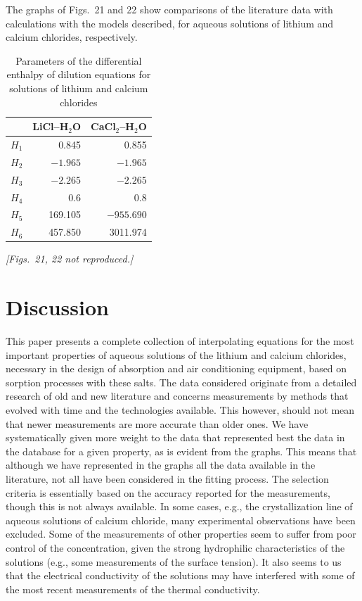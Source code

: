 \documentclass[11pt]{article}
\begin{document}
The graphs of Figs.~21 and 22 show comparisons of the literature data with calculations
with the models described, for aqueous solutions of lithium and calcium chlorides,
respectively.

\begin{table}[htbp]
\centering
\caption{Parameters of the differential enthalpy of dilution equations for solutions of
lithium and calcium chlorides}
\begin{tabular}{lrr}
\toprule
 & LiCl--H$_2$O & CaCl$_2$--H$_2$O \\
\midrule
$H_1$ & 0.845 & 0.855 \\
$H_2$ & $-1.965$ & $-1.965$ \\
$H_3$ & $-2.265$ & $-2.265$ \\
$H_4$ & 0.6 & 0.8 \\
$H_5$ & 169.105 & $-955.690$ \\
$H_6$ & 457.850 & 3011.974 \\
\bottomrule
\end{tabular}
\end{table}

\textit{[Figs.~21, 22 not reproduced.]}

\section{Discussion}

This paper presents a complete collection of interpolating equations for the most
important properties of aqueous solutions of the lithium and calcium chlorides, necessary
in the design of absorption and air conditioning equipment, based on sorption processes
with these salts. The data considered originate from a detailed research of old and new
literature and concerns measurements by methods that evolved with time and the
technologies available. This however, should not mean that newer measurements are more
accurate than older ones. We have systematically given more weight to the data that
represented best the data in the database for a given property, as is evident from the
graphs. This means that although we have represented in the graphs all the data available
in the literature, not all have been considered in the fitting process. The selection
criteria is essentially based on the accuracy reported for the measurements, though this
is not always available. In some cases, e.g., the crystallization line of aqueous
solutions of calcium chloride, many experimental observations have been excluded. Some of
the measurements of other properties seem to suffer from poor control of the
concentration, given the strong hydrophilic characteristics of the solutions (e.g., some
measurements of the surface tension). It also seems to us that the electrical conductivity
of the solutions may have interfered with some of the most recent measurements of the
thermal conductivity.
\end{document}
